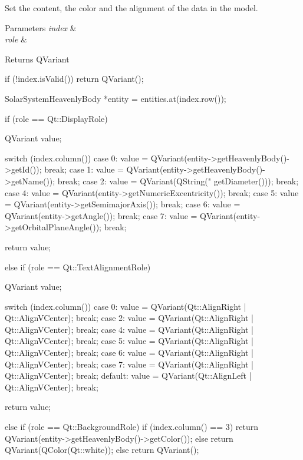 \-Set the content, the color and the alignment of the data in the model. 


\begin{DoxyParams}{\-Parameters}
{\em index} & \\
\hline
{\em role} & \\
\hline
\end{DoxyParams}
\begin{DoxyReturn}{\-Returns}
\-Q\-Variant 
\end{DoxyReturn}

\begin{DoxyCode}
{
    if (!index.isValid())
    {
        return QVariant();
    }

    SolarSystemHeavenlyBody *entity = entities.at(index.row());

    if (role == Qt::DisplayRole)
    {
        QVariant value;

        switch (index.column())
        {
        case 0:
            value = QVariant(entity->getHeavenlyBody()->getId());
            break;
        case 1:
            value = QVariant(entity->getHeavenlyBody()->getName());
            break;
        case 2:
            value = QVariant(QString("%
      getDiameter()));
            break;
        case 4:
            value = QVariant(entity->getNumericExcentricity());
            break;
        case 5:
            value = QVariant(entity->getSemimajorAxis());
            break;
        case 6:
            value = QVariant(entity->getAngle());
            break;
        case 7:
            value = QVariant(entity->getOrbitalPlaneAngle());
            break;
        }

        return value;
    }
    else if (role == Qt::TextAlignmentRole)
    {
        QVariant value;

        switch (index.column())
        {
        case 0:
            value = QVariant(Qt::AlignRight | Qt::AlignVCenter);
            break;
        case 2:
            value = QVariant(Qt::AlignRight | Qt::AlignVCenter);
            break;
        case 4:
            value = QVariant(Qt::AlignRight | Qt::AlignVCenter);
            break;
        case 5:
            value = QVariant(Qt::AlignRight | Qt::AlignVCenter);
            break;
        case 6:
            value = QVariant(Qt::AlignRight | Qt::AlignVCenter);
            break;
        case 7:
            value = QVariant(Qt::AlignRight | Qt::AlignVCenter);
            break;
        default:
            value = QVariant(Qt::AlignLeft | Qt::AlignVCenter);
            break;
        }

        return value;
    }
    else if (role == Qt::BackgroundRole)
    {
        if (index.column() == 3)
        {
            return QVariant(entity->getHeavenlyBody()->getColor());
        }
        else
        {
            return QVariant(QColor(Qt::white));
        }
    }
    else
    {
        return QVariant();
    }
}
\end{DoxyCode}
